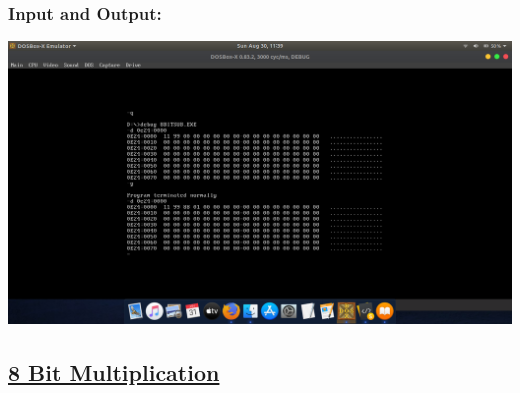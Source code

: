 \documentclass[12pt,a4paper]{article}
\begin{document}
\begin{flushleft}
\subsubsection*{\textbf{Input and Output:}}
\includegraphics[trim = 100mm 60mm 100mm 80mm, clip, width = \textwidth]{Subtraction.png}

\newpage
\subsection*{\textbf{\underline{8 Bit Multiplication}}}


\end{flushleft}
\end{document}
